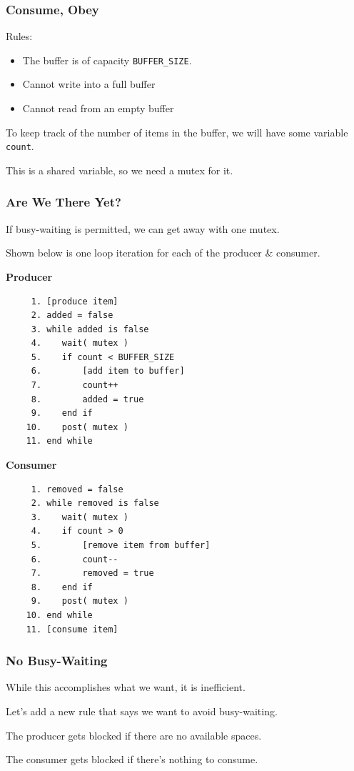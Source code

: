 \begin{frame}
\frametitle{Consume, Obey}

Rules:
\begin{itemize}
	\item The buffer is of capacity \texttt{BUFFER\_SIZE}.
	\item Cannot write into a full buffer
	\item Cannot read from an empty buffer
\end{itemize}

To keep track of the number of items in the buffer, we will have some variable \texttt{count}.

This is a shared variable, so we need a mutex for it.

\end{frame}


\begin{frame}[fragile]
\frametitle{Are We There Yet?}

If busy-waiting is permitted, we can get away with one mutex.

Shown below is one loop iteration for each of the producer \& consumer.
{\small
\begin{multicols}{2}
\textbf{Producer}
  \begin{verbatim}
	 1. [produce item]
	 2. added = false
	 3. while added is false
	 4.    wait( mutex )
	 5.    if count < BUFFER_SIZE
	 6.        [add item to buffer]
	 7.        count++
	 8.        added = true
	 9.    end if
	10.    post( mutex )
	11. end while
  \end{verbatim}
\columnbreak
\textbf{Consumer}
  \begin{verbatim}
	 1. removed = false
	 2. while removed is false
	 3.    wait( mutex )
	 4.    if count > 0
	 5.        [remove item from buffer]
	 6.        count--
	 7.        removed = true
	 8.    end if
	 9.    post( mutex )
	10. end while
	11. [consume item]
  \end{verbatim}
\end{multicols}
\vspace{-2em}
}

\end{frame}


\begin{frame}
\frametitle{No Busy-Waiting}

While this accomplishes what we want, it is inefficient.

Let's add a new rule that says we want to avoid busy-waiting.

The producer gets blocked if there are no available spaces.

The consumer gets blocked if there's nothing to consume.

\end{frame}



